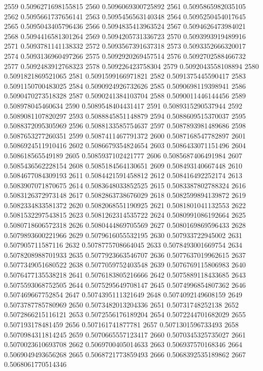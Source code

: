 2559 0.5096271698155815
2560 0.5096069300725892
2561 0.5095865982035105
2562 0.5095661737656141
2563 0.5095456563140348
2564 0.5095250454017645
2565 0.5095043405796436
2566 0.5094835413963524
2567 0.5094626473984021
2568 0.5094416581301264
2569 0.5094205731336723
2570 0.5093993919489916
2571 0.5093781141138332
2572 0.5093567391637318
2573 0.5093352666320017
2574 0.5093136960497266
2575 0.5092920269457514
2576 0.5092702588466732
2577 0.5092483912768323
2578 0.509226423758304
2579 0.5092043558108894
2580 0.5091821869521065
2581 0.5091599166971821
2582 0.5091375445590417
2583 0.5091150700483025
2584 0.5090924926732626
2585 0.5090698119398941
2586 0.5090470273518328
2587 0.5090241384103704
2588 0.5090011446144456
2589 0.508978045460634
2590 0.5089548404431417
2591 0.5089315290537944
2592 0.5089081107820297
2593 0.5088845851148879
2594 0.5088609515370037
2595 0.5088372095305969
2596 0.5088133585754637
2597 0.5087893981489686
2598 0.5087653277260351
2599 0.5087411467791372
2600 0.5087168547782897
2601 0.5086924511910416
2602 0.5086679354824654
2603 0.5086433071151496
2604 0.508618565549189
2605 0.5085937102421777
2606 0.5085687406491984
2607 0.5085436562228154
2608 0.5085184564130651
2609 0.508493140667448
2610 0.5084677084309193
2611 0.5084421591458812
2612 0.508416492252174
2613 0.5083907071870675
2614 0.5083648033852525
2615 0.5083387802788324
2616 0.5083126372973148
2617 0.5082863738676029
2618 0.5082599894139872
2619 0.5082334833581372
2620 0.5082068551190925
2621 0.5081801041132553
2622 0.5081532297543815
2623 0.5081262314535722
2624 0.5080991086192664
2625 0.5080718606572318
2626 0.5080444869705569
2627 0.5080169869596433
2628 0.5079893600221966
2629 0.5079616055532195
2630 0.507933722945002
2631 0.507905711587116
2632 0.5078775708664045
2633 0.5078493001669754
2634 0.5078208988701933
2635 0.5077923663546707
2636 0.5077637019962615
2637 0.5077349051680522
2638 0.5077059752403548
2639 0.5076769115806983
2640 0.5076477135538218
2641 0.5076183805216666
2642 0.5075889118433685
2643 0.5075593068752505
2644 0.5075295649708147
2645 0.5074996854807362
2646 0.507469667752854
2647 0.5074395111321649
2648 0.5074092149608159
2649 0.5073787785780969
2650 0.5073482013204336
2651 0.50731748252138
2652 0.5072866215116121
2653 0.5072556176189204
2654 0.5072244701682029
2655 0.507193178481459
2656 0.507161741877781
2657 0.5071301596733493
2658 0.5070984311814245
2659 0.5070665557123417
2660 0.5070345325735027
2661 0.5070023610693708
2662 0.5069700405014633
2663 0.506937570168346
2664 0.5069049493656268
2665 0.5068721773859493
2666 0.5068392535189862
2667 0.5068061770514346

